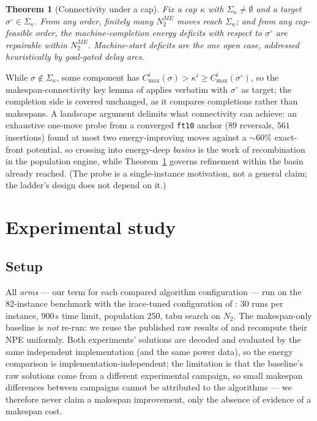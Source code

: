 \documentclass[preprint,12pt]{elsarticle}
\newtheorem{theorem}{Theorem}
\begin{document}
\begin{theorem}[Connectivity under a cap]\label{thm:capped-conn}
Fix a cap $\kappa$ with $\Sigma_\kappa\neq\emptyset$ and a target
$\sigma^{\circ}\in\Sigma_\kappa$. From any order, finitely many $N_2^{ME}$
moves reach $\Sigma_\kappa$; and from any cap-feasible order, the
machine-completion energy deficits with respect to $\sigma^{\circ}$ are
repairable within $N_2^{ME}$. Machine-start deficits are the one open case,
addressed heuristically by goal-gated delay arcs.
\end{theorem}
\noindent While $\sigma\notin\Sigma_\kappa$, some component has
$C^i_{\max}(\sigma)>\kappa^i\ge C^i_{\max}(\sigma^{\circ})$, so the
makespan-connectivity key lemma of \cite{DiazTabu2026} applies verbatim with
$\sigma^{\circ}$ as target; the completion side is covered unchanged, as it
compares completions rather than makespans. A landscape argument delimits what
connectivity can achieve: an exhaustive one-move probe from a converged
\texttt{ft10} anchor ($89$ reversals, $561$ insertions) found at most two
energy-improving moves against a ${\sim}60\%$ exact-front potential, so
crossing into energy-deep \emph{basins} is the work of recombination in the
population engine, while Theorem~\ref{thm:capped-conn} governs refinement
within the basin already reached. (The probe is a single-instance
motivation, not a general claim; the ladder's design does not depend on
it.)

\section{Experimental study}
\label{sec:experiments}

\subsection{Setup}
\label{sec:exp-setup}

All \emph{arms} --- our term for each compared algorithm configuration ---
run on the 82-instance benchmark with the irace-tuned
configuration of \cite{DiazTabu2026}: 30 runs per instance, 900\,s time
limit, population 250, tabu search on $N_2$. The makespan-only baseline is
\emph{not} re-run: we reuse the published raw results of
\cite{DiazTabu2026} and recompute their NPE uniformly. Both experiments'
solutions are decoded and evaluated by the same independent implementation
(and the same power data), so the energy comparison is
implementation-independent; the limitation is that the baseline's raw
solutions come from a different experimental campaign, so small makespan
differences between campaigns cannot be attributed to the algorithms ---
we therefore never claim a makespan improvement, only the absence of
evidence of a makespan cost.
\end{document}
